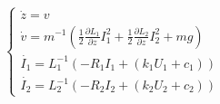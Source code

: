 \begin{equation}
    \begin{cases}
        \dot{z} = v                                                                                                                                 \\
        \dot{v} = m^{-1} \left(\frac{1}{2} \frac{\partial L_1}{\partial z} I_1^2 + \frac{1}{2} \frac{\partial L_2}{\partial z} I_2^2 + m g  \right) \\
        \dot{I_1} = L_1^{-1} \left(- R_1 I_1 + (k_1 U_1 + c_1) \right)                                                                              \\
        \dot{I_2} = L_2^{-1} \left(- R_2 I_2 + (k_2 U_2 + c_2) \right)
    \end{cases}
    \label{eq:reduced_equations_of_motion_final}
\end{equation}
